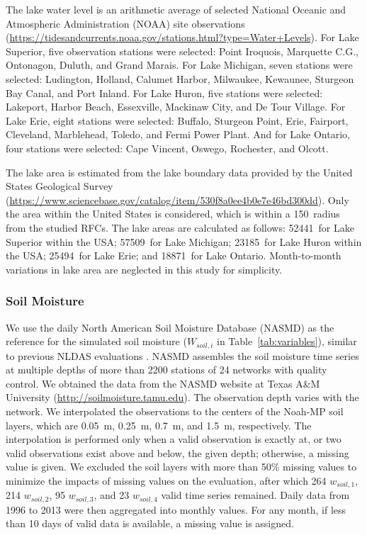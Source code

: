 \documentclass[essd, manuscript]{copernicus}
\let\unit\undefined
\begin{document}
The lake water level is an arithmetic average of selected National Oceanic and Atmospheric Administration (NOAA) site observations (\url{https://tidesandcurrents.noaa.gov/stations.html?type=Water+Levels}). For Lake Superior, five observation stations were selected: Point Iroquois, Marquette C.G., Ontonagon, Duluth, and Grand Marais. For Lake Michigan, seven stations were selected: Ludington, Holland, Calumet Harbor, Milwaukee, Kewaunee, Sturgeon Bay Canal, and Port Inland. For Lake Huron, five stations were selected: Lakeport, Harbor Beach, Essexville, Mackinaw City, and De Tour Village. For Lake Erie, eight stations were selected: Buffalo, Sturgeon Point, Erie, Fairport, Cleveland, Marblehead, Toledo, and Fermi Power Plant. And for Lake Ontario, four stations were selected: Cape Vincent, Oswego, Rochester, and Olcott.

The lake area is estimated from the lake boundary data provided by the United States Geological Survey (\url{https://www.sciencebase.gov/catalog/item/530f8a0ee4b0e7e46bd300dd}). Only the area within the United States is considered, which is within a 150\,\unit{km} radius from the studied RFCs. The lake areas are calculated as follows: 52441\,\unit{km^2} for Lake Superior within the USA; 57509\,\unit{km^2} for Lake Michigan; 23185\,\unit{km^2} for Lake Huron within the USA; 25494\,\unit{km^2} for Lake Erie; and 18871\,\unit{km^2} for Lake Ontario. Month-to-month variations in lake area are neglected in this study for simplicity.

\subsubsection{Soil Moisture}\label{sec:methods:ref:sm}

We use the daily North American Soil Moisture Database (NASMD) \citep{quiring2016BAMS} as the reference for the simulated soil moisture (\(W_{soil,i}\) in Table~\ref{tab:variables}), similar to previous NLDAS evaluations \citep{xia2015JHa, xia2015JH}. NASMD assembles the soil moisture time series at multiple depths of more than 2200 stations of 24 networks with quality control. We obtained the data from the NASMD website at Texas A\&M University (\url{http://soilmoisture.tamu.edu}). The observation depth varies with the network. We interpolated the observations to the centers of the Noah-MP soil layers, which are \qty{0.05}{m}, \qty{0.25}{m}, \qty{0.7}{m}, and \qty{1.5}{m}, respectively. The interpolation is performed only when a valid observation is exactly at, or two valid observations exist above and below, the given depth; otherwise, a missing value is given. We excluded the soil layers with more than 50\% missing values to minimize the impacts of missing values on the evaluation, after which 264 \(w_{soil,1}\), 214 \(w_{soil,2}\), 95 \(w_{soil,3}\), and 23 \(w_{soil,4}\) valid time series remained. Daily data from 1996 to 2013 were then aggregated into monthly values. For any month, if less than 10 days of valid data is available, a missing value is assigned.
\end{document}
